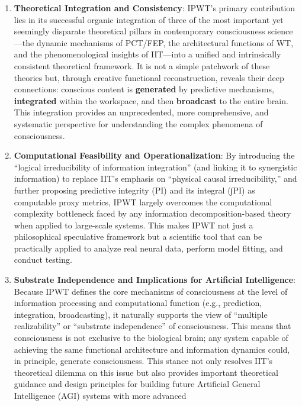 \documentclass[
  a4paper]{article}
\begin{document}
\begin{enumerate}
\def\labelenumi{\arabic{enumi}.}
\item
  \textbf{Theoretical Integration and Consistency}: IPWT's primary
  contribution lies in its successful organic integration of three of
  the most important yet seemingly disparate theoretical pillars in
  contemporary consciousness science---the dynamic mechanisms of
  PCT/FEP, the architectural functions of WT, and the phenomenological
  insights of IIT---into a unified and intrinsically consistent
  theoretical framework. It is not a simple patchwork of these theories
  but, through creative functional reconstruction, reveals their deep
  connections: conscious content is \textbf{generated} by predictive
  mechanisms, \textbf{integrated} within the workspace, and then
  \textbf{broadcast} to the entire brain. This integration provides an
  unprecedented, more comprehensive, and systematic perspective for
  understanding the complex phenomena of consciousness.
\item
  \textbf{Computational Feasibility and Operationalization}: By
  introducing the ``logical irreducibility of information integration''
  (and linking it to synergistic information) to replace IIT's emphasis
  on ``physical causal irreducibility,'' and further proposing
  predictive integrity (PI) and its integral (∫PI) as computable proxy
  metrics, IPWT largely overcomes the computational complexity
  bottleneck faced by any information decomposition-based theory when
  applied to large-scale systems. This makes IPWT not just a
  philosophical speculative framework but a scientific tool that can be
  practically applied to analyze real neural data, perform model
  fitting, and conduct testing.
\item
  \textbf{Substrate Independence and Implications for Artificial
  Intelligence}: Because IPWT defines the core mechanisms of
  consciousness at the level of information processing and computational
  function (e.g., prediction, integration, broadcasting), it naturally
  supports the view of ``multiple realizability'' or ``substrate
  independence'' of consciousness. This means that consciousness is not
  exclusive to the biological brain; any system capable of achieving the
  same functional architecture and information dynamics could, in
  principle, generate consciousness. This stance not only resolves IIT's
  theoretical dilemma on this issue but also provides important
  theoretical guidance and design principles for building future
  Artificial General Intelligence (AGI) systems with more advanced

\end{enumerate}
\end{document}
